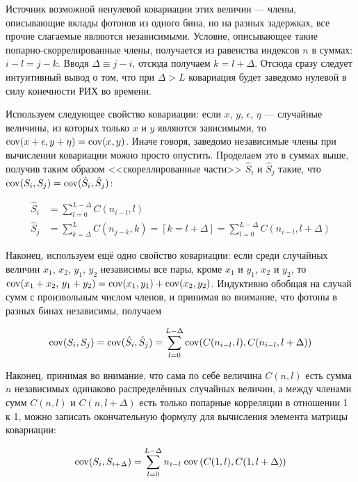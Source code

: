 Источник возможной ненулевой ковариации этих величин --- члены, описывающие вклады фотонов из одного бина, но на разных задержках, все прочие слагаемые являются независимыми. Условие, описывающее такие попарно-скоррелированные члены, получается из равенства индексов $n$ в суммах: $i-l = j-k$. Вводя $\Delta \equiv j - i$, отсюда получаем $k = l + \Delta$. Отсюда сразу следует интуитивный вывод о том, что при $\Delta > L$ ковариация будет заведомо нулевой в силу конечности РИХ во времени.

Используем следующее свойство ковариации: если $x$, $y$, $\epsilon$, $\eta$ --- случайные величины, из которых только $x$ и $y$ являются зависимыми, то $\mathrm{cov}(x + \epsilon, y + \eta) = \mathrm{cov}(x, y)$. Иначе говоря, заведомо независимые члены при вычислении ковариации можно просто опустить. Проделаем это в суммах выше, получив таким образом <<скореллированные части>> $\hat{S}_i$ и $\hat{S}_j$ такие, что $\mathrm{cov} ( S_i, S_j  ) = \mathrm{cov} ( \hat{S}_i, \hat{S}_j )$:

\begin{align}
	\hat{S}_i &= \sum_{l=0}^{L-\Delta} C(n_{i-l}, l)\\
	\hat{S}_j &= \sum_{k=\Delta}^{L} C(n_{j-k}, k) = \left[k=l+\Delta\right] = \sum_{l=0}^{L-\Delta} C(n_{i-l}, l+\Delta)
\end{align}

Наконец, используем ещё одно свойство ковариации: если среди случайных величин $x_1$, $x_2$, $y_1$, $y_2$ независимы все пары, кроме $x_1$ и $y_1$, $x_2$ и $y_2$, то $\mathrm{cov}(x_1 + x_2, \, y_1 + y_2) = \mathrm{cov}(x_1, y_1) + \mathrm{cov}(x_2, y_2)$. Индуктивно обобщая на случай сумм с произвольным числом членов, и принимая во внимание, что фотоны в разных бинах независимы, получаем

\begin{equation}
	\mathrm{cov}(S_i, S_j) = \mathrm{cov}(\hat{S}_i, \hat{S}_j) = \sum_{l=0}^{L - \Delta} \mathrm{cov}(C(n_{i-l}, l), C(n_{i-l}, l + \Delta))
\end{equation}

Наконец, принимая во внимание, что сама по себе величина $C(n, l)$ есть сумма $n$ независимых одинаково распределённых случайных величин, а между членами сумм $C(n, l)$ и $C(n, l + \Delta)$ есть только попарные корреляции в отношении 1 к 1, можно записать окончательную формулу для вычисления элемента матрицы ковариации:

\begin{equation}
	\mathrm{cov}(S_i, S_{i + \Delta}) = \sum_{l=0}^{L - \Delta} n_{i-l} \; \mathrm{cov}\left(C(1, l), C(1, l + \Delta)\right)
\end{equation}


